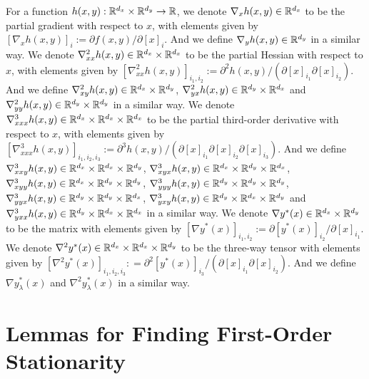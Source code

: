 For a function $h(x,y) : {\mathbb{R}}^{d_x} \times {\mathbb{R}}^{d_y} \rightarrow {\mathbb{R}}$,
we denote $\nabla_x h(x,y) \in {\mathbb{R}}^{d_x}$ to be the partial gradient with respect to $x$, with elements given by $ [\nabla_x h(x,y) ]_{i} := \partial f(x,y) / \partial [x]_{i}$. And we define $\nabla_y h(x,y) \in {\mathbb{R}}^{d_y}$ in a similar way.  We denote $ \nabla_{xx}^2 h(x,y) \in {\mathbb{R}}^{d_x} \times {\mathbb{R}}^{d_x}$ to be the partial Hessian with respect to $x$, with elements given by $ [\nabla_{xx}^2 h(x,y)]_{i_1,i_2} := \partial^2 h(x,y) / (\partial [x]_{i_1} \partial [x]_{i_2})$. And we define $ \nabla_{xy}^2 h(x,y) \in {\mathbb{R}}^{d_x} \times {\mathbb{R}}^{d_y} $, $\nabla_{yx}^2 h(x,y) \in {\mathbb{R}}^{d_y} \times {\mathbb{R}}^{d_x}$ and  $ \nabla_{yy}^2 h(x,y) \in {\mathbb{R}}^{d_y} \times {\mathbb{R}}^{d_y}$ in a similar way.  We denote $\nabla_{xxx}^3 h(x,y) \in {\mathbb{R}}^{d_x} \times {\mathbb{R}}^{d_x} \times {\mathbb{R}}^{d_x}$ to be the partial third-order derivative with respect to $x$, with elements given by 
$ [\nabla_{xxx}^3 h(x,y)]_{i_1,i_2,i_3} := \partial^3 h(x,y) / (\partial [x]_{i_1} \partial [x]_{i_2} \partial [x]_{i_3})$. And we define $\nabla_{xxy}^3 h(x,y) \in {\mathbb{R}}^{d_x} \times {\mathbb{R}}^{d_x} \times {\mathbb{R}}^{d_y}$, $\nabla_{xyx}^3 h(x,y) \in {\mathbb{R}}^{d_x} \times {\mathbb{R}}^{d_y} \times {\mathbb{R}}^{d_x}$,
$\nabla_{xyy}^3 h(x,y) \in {\mathbb{R}}^{d_x} \times {\mathbb{R}}^{d_y} \times {\mathbb{R}}^{d_y}$,
$\nabla_{yyy}^3 h(x,y) \in {\mathbb{R}}^{d_y} \times {\mathbb{R}}^{d_y} \times {\mathbb{R}}^{d_y}$,
$\nabla_{yyx}^3 h(x,y) \in {\mathbb{R}}^{d_y} \times {\mathbb{R}}^{d_y} \times {\mathbb{R}}^{d_x}$,
$\nabla_{yxy}^3 h(x,y) \in {\mathbb{R}}^{d_y} \times {\mathbb{R}}^{d_x} \times {\mathbb{R}}^{d_y}$
and$\nabla_{yxx}^3 h(x,y) \in {\mathbb{R}}^{d_y} \times {\mathbb{R}}^{d_x} \times {\mathbb{R}}^{d_x}$
in a similar way.
We denote $\nabla y^*(x) \in {\mathbb{R}}^{d_x} \times {\mathbb{R}}^{d_y} $ to be the matrix with elements given by $[\nabla y^*(x) ]_{i_1,i_2} :=  \partial [y^*(x)]_{i_2}/\partial [x]_{i_1}$. We denote $\nabla^2 y^*(x) \in {\mathbb{R}}^{d_x} \times {\mathbb{R}}^{d_x} \times {\mathbb{R}}^{d_y} $ to be the three-way tensor with elements given by $[\nabla^2 y^*(x)]_{i_1,i_2,i_3}: = \partial^2 [y^*(x)]_{i_3} / (\partial [x]_{i_1} \partial [x]_{i_2})$. And we define $\nabla y_{\lambda}^*(x)$ and $\nabla^2 y_{\lambda}^*(x)$ in a similar way.


\section{Lemmas for Finding First-Order Stationarity} \label{apx:lem-1st}

